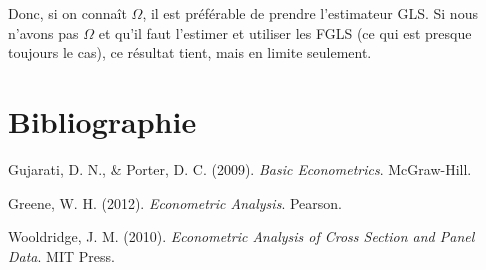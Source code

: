 \documentclass[14pt]{extarticle} %
\theoremstyle{definition}
\theoremstyle{plain}
\begin{document}
Donc, si on connaît $\Omega$, il est préférable de prendre l’estimateur GLS. Si nous n’avons pas $\Omega$ et qu’il faut l’estimer et utiliser les FGLS (ce qui est presque toujours le cas), ce résultat tient, mais en limite seulement.

\section{Bibliographie}

\begin{thebibliography}{9}

Gujarati, D. N., \& Porter, D. C. (2009). \textit{Basic Econometrics}. McGraw-Hill.

Greene, W. H. (2012). \textit{Econometric Analysis}. Pearson.

Wooldridge, J. M. (2010). \textit{Econometric Analysis of Cross Section and Panel Data}. MIT Press.

\end{thebibliography}
\end{document}
